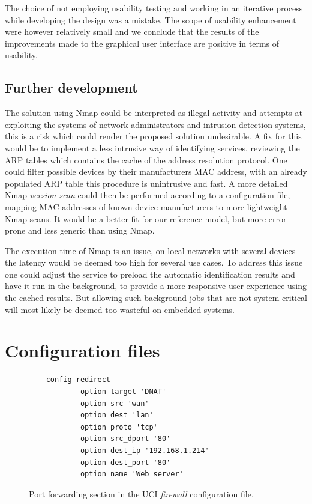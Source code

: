 \documentclass[a4paper,11pt,makeidx]{kth-bcs}
\begin{document}
The choice of not employing usability testing and working in an iterative process while developing the design was a mistake.
The scope of usability enhancement were however relatively small and we conclude that the results of the improvements made to the graphical user interface are positive in terms of usability.

\newpage
\section{Further development}
The solution using Nmap could be interpreted as illegal activity and attempts at exploiting the systems of network administrators and intrusion detection systems, this is a risk which could render the proposed solution undesirable.
A fix for this would be to implement a less intrusive way of identifying services, reviewing the ARP tables which contains the cache of the address resolution protocol.
One could filter possible devices by their manufacturers MAC address, with an already populated ARP table this procedure is unintrusive and fast.
A more detailed Nmap \emph{version scan} could then be performed according to a configuration file, mapping MAC addresses of known device manufacturers to more lightweight Nmap scans.
It would be a better fit for our reference model, but more error-prone and less generic than using Nmap.

The execution time of Nmap is an issue, on local networks with several devices the latency would be deemed too high for several use cases.
To address this issue one could adjust the service to preload the automatic identification results and have it run in the background, to provide a more responsive user experience using the cached results.
But allowing such background jobs that are not system-critical will most likely be deemed too wasteful on embedded systems.

\newpage
\newpage
\appendix
\addappheadtotoc
\chapter{Configuration files}\label{appA}

   \begin{figure}[ht]
      \centering
      \begin{lstlisting}
    config redirect               
            option target 'DNAT' 
            option src 'wan'
            option dest 'lan'
            option proto 'tcp'
            option src_dport '80'
            option dest_ip '192.168.1.214'
            option dest_port '80' 
            option name 'Web server'
      \end{lstlisting}
      \caption{
         \small{
Port forwarding section in the UCI \emph{firewall} configuration file.
         }
      }
      \label{fig:redirect_conf}
   \end{figure}
\end{document}
